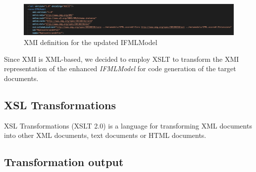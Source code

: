 \vspace{0.5cm}
\begin{figure}[H]
  \centering
    \includegraphics[width=15cm]{images/xmi-header.png}
  \caption{XMI definition for the updated IFMLModel}
  \label{fig:xmi-header}
\end{figure}
\vspace{0.5cm}


Since XMI is XML-based, we decided to employ XSLT to transform the XMI representation of the enhanced \textit{IFMLModel} for code generation of the target documents. 




\subsection{XSL Transformations}

XSL Transformations (XSLT 2.0) is a language for transforming XML documents into other XML documents, text documents or HTML documents\cite{xslt}.

\subsection{Transformation output}


